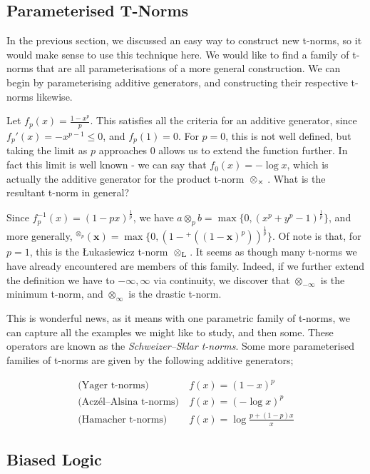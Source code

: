 \subsection{Parameterised T-Norms}

In the previous section, we discussed an easy way to construct new t-norms, so it would make sense to use this technique here. We would like to find a family of t-norms that are all parameterisations of a more general construction. We can begin by parameterising additive generators, and constructing their respective t-norms likewise.

Let $f_p(x) = \frac{1 - x^p}{p}$. This satisfies all the criteria for an additive generator, since $f_p'(x) = -x^{p-1} \leq 0$, and $f_p(1) = 0$. For $p=0$, this is not well defined, but taking the limit as $p$ approaches 0 allows us to extend the function further. In fact this limit is well known - we can say that $f_0(x)=-\log x$, which is actually the additive generator for the product t-norm ${\mspace{4mu}\otimes_\times\mspace{4mu}}$. What is the resultant t-norm in general?

Since $f^{-1}_p(x) = (1-px)^\frac{1}{p}$, we have $a \otimes_p b = \max\{0, (x^p + y^p - 1)^\frac{1}{p}\}$, and more generally, ${^{\otimes_p}}(\mathbf{x}) = \max\{0, (1 - {^+}((1 - \mathbf{x})^p))^\frac{1}{p}\}$. Of note is that, for $p=1$, this is the Łukasiewicz t-norm ${\mspace{4mu}\otimes_\text{L}\mspace{4mu}}$. It seems as though many t-norms we have already encountered are members of this family. Indeed, if we further extend the definition we have to $-\infty, \infty$ via continuity, we discover that $\otimes_{-\infty}$ is the minimum t-norm, and $\otimes_\infty$ is the drastic t-norm.

This is wonderful news, as it means with one parametric family of t-norms, we can capture all the examples we might like to study, and then some. These operators are known as the \textit{Schweizer–Sklar t-norms}. Some more parameterised families of t-norms are given by the following additive generators;

$$
\begin{aligned}
\text{(Yager t-norms)}&\ f(x) = (1-x)^p \\
\text{(Aczél–Alsina t-norms)}&\ f(x) = (- \log x)^p \\
\text{(Hamacher t-norms)}&\ f(x) = \log\frac{p+(1-p)x}{x}
\end{aligned}
$$

\subsection{Biased Logic}

